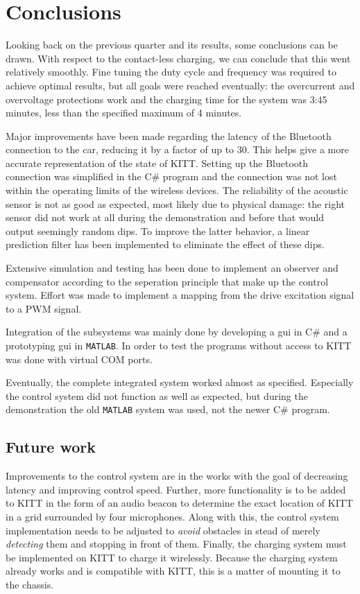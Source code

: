 \documentclass[11pt,titlepage]{report}
\begin{document}
\chapter{Conclusions}
\label{ch:conclusions}
Looking back on the previous quarter and its results, some conclusions can be drawn. With respect to the contact-less charging, we can conclude that this went relatively smoothly. Fine tuning the duty cycle and frequency was required to achieve optimal results, but all goals were reached eventually: the overcurrent and overvoltage protections work and the charging time for the system was 3:45 minutes, less than the specified maximum of 4 minutes.

Major improvements have been made regarding the latency of the Bluetooth connection to the car, reducing it by a factor of up to 30. This helps give a more accurate representation of the state of KITT. Setting up the Bluetooth connection was simplified in the C\# program and the connection was not lost within the operating limits of the wireless devices. The reliability of the acoustic sensor is not as good as expected, most likely due to physical damage: the right sensor did not work at all during the demonstration and before that would output seemingly random dips. To improve the latter behavior, a linear prediction filter has been implemented to eliminate the effect of these dips.

Extensive simulation and testing has been done to implement an observer and compensator according to the seperation principle that make up the control system. Effort was made to implement a mapping from the drive excitation signal to a PWM signal.

Integration of the subsystems was mainly done by developing a gui in C\# and a prototyping gui in \texttt{MATLAB}. In order to test the programs without access to KITT was done with virtual COM ports.

Eventually, the complete integrated system worked almost as specified. Especially the control system did not function as well as expected, but during the demonstration the old \texttt{MATLAB} system was used, not the newer C\# program.

\section{Future work}
Improvements to the control system are in the works with the goal of decreasing latency and improving control speed. Further, more functionality is to be added to KITT in the form of an audio beacon to determine the exact location of KITT in a grid surrounded by four microphones. Along with this, the control system implementation needs to be adjusted to \textit{avoid} obstacles in stead of merely \textit{detecting} them and stopping in front of them. Finally, the charging system must be implemented on KITT to charge it wirelessly. Because the charging system already works and is compatible with KITT, this is a matter of mounting it to the chassis.
\end{document}
